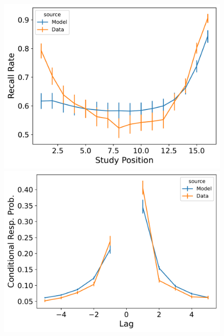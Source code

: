 \documentclass[
  letterpaper,
  11pt,
  english,
  singlespacing,
  headsepline]{MastersDoctoralThesis}
\begin{document}
\begin{figure}
\begin{minipage}{0.33\linewidth}
\includegraphics{icmr_figures/HealyKahana2014_ConnectionistCMR_Model_Fitting_spc-1.png}\end{minipage}%
\newline
\begin{minipage}{0.33\linewidth}
\includegraphics{icmr_figures/HealyKahana2014_InstanceCMR_Model_Fitting_crp-1.png}\end{minipage}%
%
\begin{minipage}{0.33\linewidth}

\end{minipage}
\end{figure}
\end{document}
